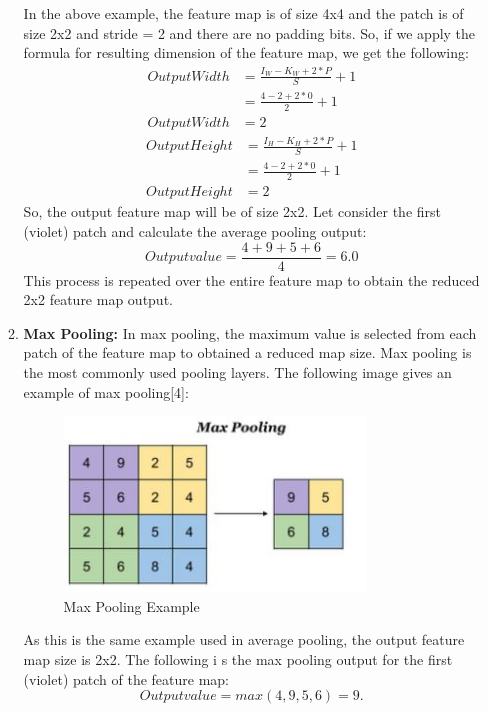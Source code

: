 \documentclass{IEEEtran}
\begin{document}
\begin{enumerate}
\begin{enumerate}
In the above example, the feature map is of size 4x4 and the patch is of size 2x2 and stride = 2 and there are no padding bits. So, if we apply the formula for resulting dimension of the feature map, we get the following:
\begin{equation*}
\begin{aligned}
Output Width &= \frac{I_W - K_W + 2*P}{S} + 1 \\
			&= \frac{4 - 2 + 2*0}{2} + 1 \\
Output Width&= 2 
\end{aligned} 
\end{equation*}
\begin{equation*}
\begin{aligned}
Output Height &= \frac{I_H - K_H + 2*P}{S} + 1 \\
			&= \frac{4 - 2 + 2*0}{2} + 1 \\
Output Height&= 2 
\end{aligned} 
\end{equation*}
So, the output feature map will be of size 2x2. Let consider the first (violet) patch and calculate the average pooling output:
\begin{equation*}
Output value = \frac{4 + 9 + 5 + 6}{4} = 6.0
\end{equation*}
This process is repeated over the entire feature map to obtain the reduced 2x2 feature map output.

\item \textbf{Max Pooling:} In max pooling, the maximum value is selected from each patch of the feature map to obtained a reduced map size. Max pooling is the most commonly used pooling layers.  The following image gives an example of max pooling[4]:
 
\begin{figure}[h]
    \centering
    \captionsetup{justification=centering}
    \includegraphics[width=8cm]{maxpool}
    \caption{Max Pooling Example}
    \label{fig:Max Pooling Example}
\end{figure}

As this is the same example used in average pooling, the output feature map size is 2x2. The following i s the max pooling output for the first (violet) patch of the feature map:
\begin{equation*}
Output value = max(4,9,5,6) = 9.
\end{equation*}
\end{enumerate}
\end{enumerate}
\end{document}
